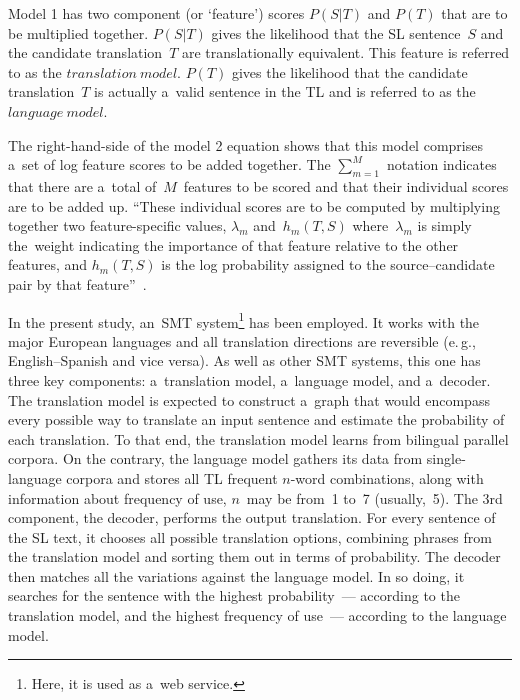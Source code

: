 \begin{multicols}{2}
  Model 1 has two component (or `feature') scores $P(S\vert T)$ and $P(T)$ that 
are to be multiplied together. $P(S\vert T)$ gives the likelihood that the SL 
sentence~$S$ and the candidate translation~$T$ are translationally equivalent. 
This feature is referred to as the $translation\ model$. $P(T)$ gives the likelihood 
that the candidate translation~$T$ is actually a~valid sentence in the TL and is 
referred to as the $language\ model$.
  
  The right-hand-side of the model 2 equation shows that this model comprises 
  a~set of log feature scores to be added together. The $\sum\nolimits^M_{m=1}$ 
notation indicates that there are a~total of~$M$~features to be scored and that their 
individual scores are to be added up. ``These individual scores are to be computed 
by multiplying together two feature-specific values, $\lambda_m$ and~$h_m (T, 
S)$ where~$\lambda_m$ is simply the~weight indicating the importance of that 
feature relative to the other features, and $h_m (T, S)$ is the log probability 
assigned to the source--candidate pair by that feature''~\cite{12-n}.
  
  In the present study,  an~SMT system\footnote{Here, it is used as a~web service.} 
  has been employed. It 
works with the major European languages and all translation directions are 
reversible (e.\,g., English--Spanish and vice versa). As well as other SMT systems, 
this one has three key components: a~translation model, a~language model, and 
a~decoder. The translation model is expected to construct a~graph that would 
encompass every possible way to translate an input sentence and estimate the 
probability of each translation. To that end, the translation model learns from 
bilingual parallel corpora. On the contrary, the language model gathers its data 
from single-language corpora and stores all TL frequent $n$-word combinations, 
along with information about frequency of use, $n$~may be from~1 to~7 (usually,~5). 
The 3rd component, the decoder, performs the output translation. For every 
sentence of the SL text, it chooses all possible translation options, combining 
phrases from the translation model and sorting them out in terms of probability. 
The decoder then matches all the variations against the language model. In so 
doing, it searches for the sentence with the highest probability~--- according to the 
translation model, and the highest frequency of use~--- according to the language 
model.

\vspace*{-6pt}
  

\end{multicols}
